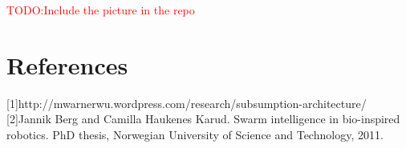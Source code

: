 \documentclass{article}
\newcommand\TODO[1]{\textcolor{red}{TODO:#1}}
\newcommand\todo[1]{\TODO{#1}}
\begin{document}
\newpage
\todo{Include the picture in the repo}

\newpage
\part{References}
[1]http://mwarnerwu.wordpress.com/research/subsumption-architecture/
[2]Jannik Berg and Camilla Haukenes Karud. Swarm intelligence in bio-inspired robotics. PhD thesis,
Norwegian University of Science and Technology, 2011.



\nocite{*}
\end{document}
